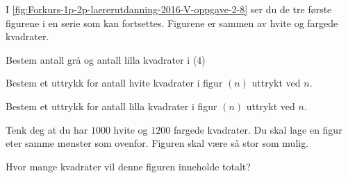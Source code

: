 I \cref{fig:Forkurs-1p-2p-laererutdanning-2016-V-oppgave-2-8} ser du de tre
første figurene i en serie som kan fortsettes. Figurene er sammen av hvite og
fargede kvadrater.

\begin{oppgaver}
   Bestem antall grå og antall lilla kvadrater i (4)
\end{oppgaver}

\begin{oppgaver}
   Bestem et uttrykk for antall hvite kvadrater i figur $(n)$ uttrykt
    ved $n$.
\end{oppgaver}

\begin{oppgaver}
   Bestem et uttrykk for antall lilla kvadrater i figur $(n)$ uttrykt
    ved $n$.
\end{oppgaver}

Tenk deg at du har $\num{1000}$ hvite og $\num{1200}$ fargede kvadrater. Du skal
lage en figur eter samme mønster som ovenfor. Figuren skal være så stor som
mulig.

\begin{oppgaver}
   Hvor mange kvadrater vil denne figuren inneholde totalt?
\end{oppgaver}
